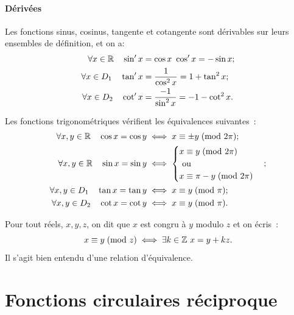 \paragraph{Dérivées}
Les fonctions sinus, cosinus, tangente et cotangente sont dérivables sur leurs 
ensembles de définition, et on a:
\begin{align}
    \forall x \in \mathbb{R} \quad \sin'x &=\cos x \ \cos'x=-\sin x; \\
    \forall x \in D_1 \quad \tan'x &=\frac{1}{\cos^2 x}=1+\tan^2 x; \\
    \forall x \in D_2 \quad \cot'x &=\frac{-1}{\sin^2 x}=-1-\cot^2 x.
\end{align}
\begin{prop}
    Les fonctions trigonométriques vérifient les équivalences suivantes~:
    \begin{align}
        \forall x, y \in \mathbb{R} \quad \cos x = \cos y &\iff x \equiv \pm y\!\pmod {2\pi} 
        ;\\
        \forall x, y \in \mathbb{R} \quad \sin x = \sin y &\iff \begin{cases} 
        x \equiv y\!\pmod {2\pi} \\ \text{~ou~} \\ x \equiv \pi-y\!\pmod {2\pi}\end{cases} 
        ; \\
            \forall x, y \in D_1 \quad \tan x = \tan y &\iff x \equiv y\!\pmod {\pi} 
            ;\\
            \forall x, y \in D_2 \quad \cot x = \cot y &\iff x \equiv y\!\pmod {\pi} 
            .
    \end{align}
\end{prop}
\begin{defdef}[Congruence]
    Pour tout réels, \(x, y, z\), on dit que \(x\) est congru à \(y\) modulo 
    \(z\) et on écris~:
    \begin{equation}
        x \equiv y\!\pmod {z} \iff \exists k \in \mathbb{Z} \ x = y + kz.
    \end{equation}
    Il s'agit bien entendu d'une relation d'équivalence.
\end{defdef}
\section{Fonctions circulaires réciproque}
\label{sec:chap1-fonctionscircréciproques}
